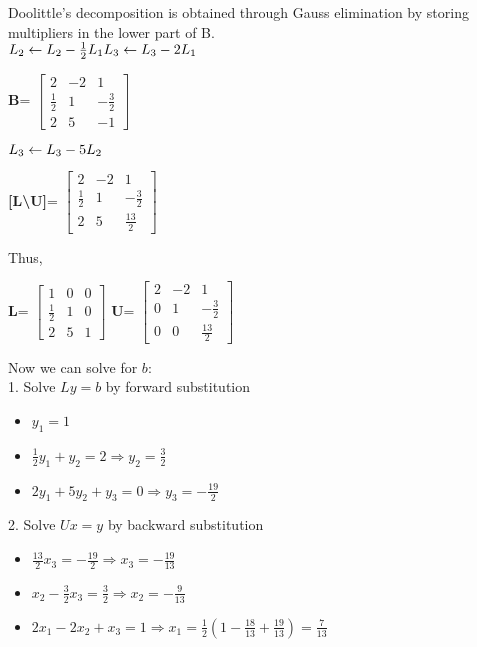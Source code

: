 \documentclass[12pt]{article}
\begin{document}
Doolittle's decomposition is obtained through Gauss elimination by storing multipliers in the lower part of B. \\
$L_2 \gets L_2 - \frac{1}{2} L_1 \\
L_3 \gets L_3 - 2L_1 $ \\
\begin{center}
\textbf{B}=
$\begin{bmatrix}
2&-2&1\\
\boxed{\frac{1}{2}}&1&-\frac{3}{2}\\
\boxed{2}&5&-1
\end{bmatrix}
$
\end{center}
$L_3 \gets L_3 - 5L_2 \\$
\begin{center}
\textbf{[L\textbackslash U]}=
$\begin{bmatrix}
2&-2&1\\
\boxed{\frac{1}{2}}&1&-\frac{3}{2}\\
\boxed{2}&\boxed{5}&\frac{13}{2}
\end{bmatrix}
$
\end{center}
Thus,
\begin{center}
\textbf{L}=
$\begin{bmatrix}
1&0&0\\
\frac{1}{2}&1&0\\
2&5&1
\end{bmatrix}
$
\textbf{U}=
$\begin{bmatrix}
2&-2&1\\
0&1&-\frac{3}{2}\\
0&0&\frac{13}{2}
\end{bmatrix}
$
\end{center}

\noindent Now we can solve for $b$: \\
1. Solve $Ly = b$ by forward substitution
\begin{itemize}
\item $y_1 = 1$
\item $\frac{1}{2}y_1 + y_2=2 \Rightarrow y_2=\frac{3}{2}$
\item $2y_1+5y_2+y_3=0 \Rightarrow y_3=-\frac{19}{2}$
\end{itemize}
2. Solve $Ux = y$ by backward substitution
\begin{itemize}
\item $\frac{13}{2}x_3=-\frac{19}{2} \Rightarrow x_3=-\frac{19}{13}$
\item $x_2-\frac{3}{2}x_3=\frac{3}{2} \Rightarrow x_2=-\frac{9}{13}$
\item $2x_1-2x_2+x_3=1 \Rightarrow x_1=\frac{1}{2}(1-\frac{18}{13}+\frac{19}{13})=\frac{7}{13}$
\end{itemize}
\end{document}
